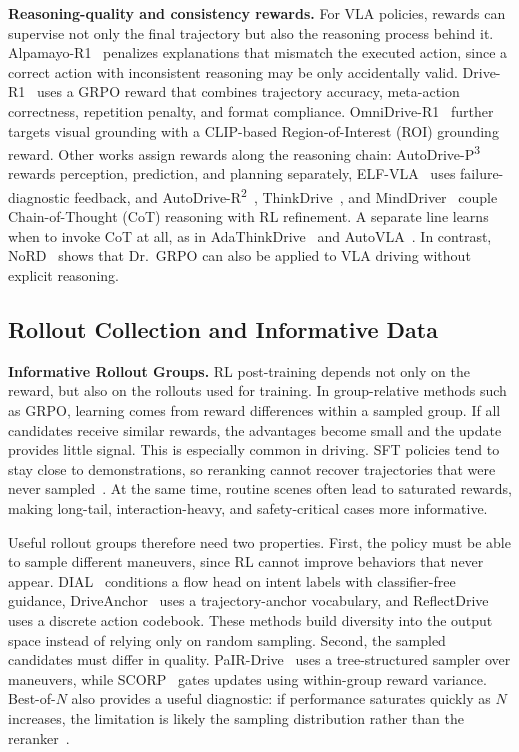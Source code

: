 \documentclass[runningheads]{llncs}
\begin{document}
\textbf{Reasoning-quality and consistency rewards.}
For VLA policies, rewards can supervise not only the final trajectory but also the reasoning process behind it. Alpamayo-R1~\cite{alpamayo2025} penalizes explanations that mismatch the executed action, since a correct action with inconsistent reasoning may be only accidentally valid. Drive-R1~\cite{li2026drive} uses a GRPO reward that combines trajectory accuracy, meta-action correctness, repetition penalty, and format compliance. OmniDrive-R1~\cite{zhang2026omnidrive} further targets visual grounding with a CLIP-based Region-of-Interest (ROI) grounding reward. Other works assign rewards along the reasoning chain: AutoDrive-P\textsuperscript{3}~\cite{autodrivep3_2026} rewards perception, prediction, and planning separately, ELF-VLA~\cite{elfvla2026} uses failure-diagnostic feedback, and AutoDrive-R\textsuperscript{2}~\cite{autodriver2_2025}, ThinkDrive~\cite{thinkdrive2026}, and MindDriver~\cite{minddriver2026} couple Chain-of-Thought (CoT) reasoning with RL refinement. A separate line learns when to invoke CoT at all, as in AdaThinkDrive~\cite{adathinkdrive2025} and AutoVLA~\cite{autovla2025}. In contrast, NoRD~\cite{nord2026} shows that Dr.~GRPO can also be applied to VLA driving without explicit reasoning.




\subsection{Rollout Collection and Informative Data}
\label{sec:exploration}

\textbf{Informative Rollout Groups.}
RL post-training depends not only on the reward, but also on the rollouts used for training. In group-relative methods such as GRPO, learning comes from reward differences within a sampled group. If all candidates receive similar rewards, the advantages become small and the update provides little signal. This is especially common in driving. SFT policies tend to stay close to demonstrations, so reranking cannot recover trajectories that were never sampled~\cite{dial2026}. At the same time, routine scenes often lead to saturated rewards, making long-tail, interaction-heavy, and safety-critical cases more informative.

Useful rollout groups therefore need two properties. First, the policy must be able to sample different maneuvers, since RL cannot improve behaviors that never appear. DIAL~\cite{dial2026} conditions a flow head on intent labels with classifier-free guidance, DriveAnchor~\cite{driveanchor2026} uses a trajectory-anchor vocabulary, and ReflectDrive~\cite{reflectdrive2025} uses a discrete action codebook. These methods build diversity into the output space instead of relying only on random sampling. Second, the sampled candidates must differ in quality. PaIR-Drive~\cite{pairdrive2026} uses a tree-structured sampler over maneuvers, while SCORP~\cite{scorp2026} gates updates using within-group reward variance. Best-of-$N$ also provides a useful diagnostic: if performance saturates quickly as $N$ increases, the limitation is likely the sampling distribution rather than the reranker~\cite{dial2026}.
\end{document}
